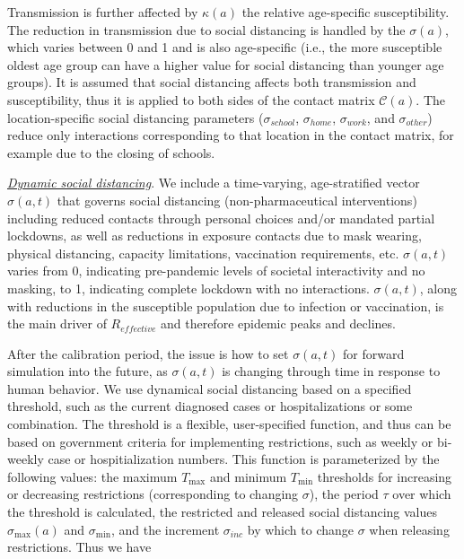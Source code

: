 \documentclass[11pt]{article}
\begin{document}
Transmission is further affected by $\kappa(a)$ the relative age-specific susceptibility. The reduction in transmission due to social distancing is handled by the $\sigma(a)$, which varies between 0 and 1 and is also age-specific (i.e., the more susceptible oldest age group can have a higher value for social distancing than younger age groups). It is assumed that social distancing affects both transmission and susceptibility, thus it is applied to both sides of the contact matrix $\mathcal{C}(a)$. The location-specific social distancing parameters ($\sigma_{school}$, $\sigma_{home}$, $\sigma_{work}$, and $\sigma_{other}$) reduce only interactions corresponding to that location in the contact matrix, for example due to the closing of schools.




\underline{\it Dynamic social distancing}. We include a time-varying, age-stratified vector $\sigma(a,t)$ that governs social distancing (non-pharmaceutical interventions) including reduced contacts through personal choices and/or mandated partial lockdowns, as well as reductions in exposure contacts due to mask wearing, physical distancing, capacity limitations, vaccination requirements, etc. $\sigma(a,t)$ varies from 0, indicating pre-pandemic levels of societal interactivity and no masking, to 1, indicating complete lockdown with no interactions. $\sigma(a,t)$, along with reductions in the susceptible population due to infection or vaccination, is the main driver of $R_{effective}$ and therefore epidemic peaks and declines.

After the calibration period, the issue is how to set $\sigma(a,t)$ for forward simulation into the future, as $\sigma(a,t)$ is changing through time in response to human behavior. We use dynamical social distancing based on a specified threshold, such as the current diagnosed cases or hospitalizations or some combination. The threshold is a flexible, user-specified function, and thus can be based on government criteria for implementing restrictions, such as weekly or bi-weekly case or hospitialization numbers. This function is parameterized by the following values: the maximum $T_{\max}$ and minimum  $T_{\min}$ thresholds for increasing or decreasing restrictions (corresponding to changing $\sigma$), the period $\tau$ over which the threshold is calculated, the restricted and released social distancing values $\sigma_{\max}(a)$ and $\sigma_{\min}$, and the increment $\sigma_{inc}$ by which to change $\sigma$ when releasing restrictions. Thus we have  
\end{document}
